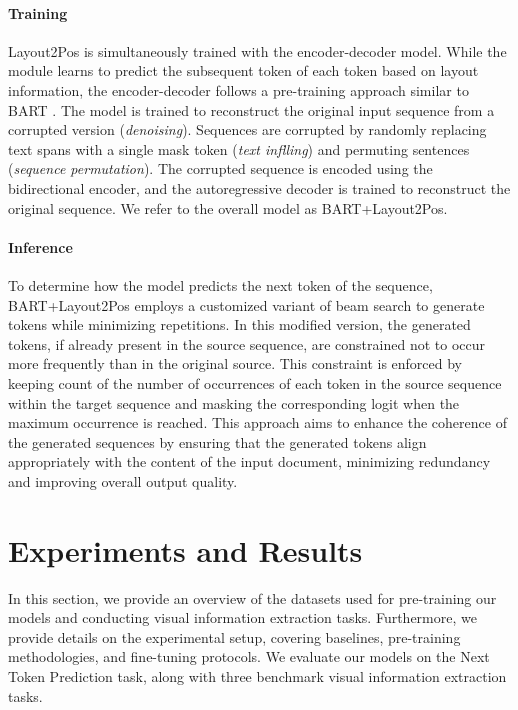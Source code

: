 \paragraph{Training} Layout2Pos is simultaneously trained with the encoder-decoder model. While the module learns to predict the subsequent token of each token based on layout information, the encoder-decoder follows a pre-training approach similar to \ac{BART}  \citep{lewis2006building}. The model is trained to reconstruct the original input sequence from a corrupted version (\textit{denoising}). Sequences are corrupted by randomly replacing text spans with a single mask token (\textit{text inflling}) and permuting sentences (\textit{sequence permutation}). The corrupted sequence is encoded using the bidirectional encoder, and the autoregressive decoder is trained to reconstruct the original sequence. We refer to the overall model as BART+Layout2Pos.

\paragraph{Inference} To determine how the model predicts the next token of the sequence, BART+Layout2Pos employs a customized variant of beam search to generate tokens while minimizing repetitions. In this modified version, the generated tokens, if already present in the source sequence, are constrained not to occur more frequently than in the original source. This constraint is enforced by keeping count of the number of occurrences of each token in the source sequence within the target sequence and masking the corresponding logit when the maximum occurrence is reached. This approach aims to enhance the coherence of the generated sequences by ensuring that the generated tokens align appropriately with the content of the input document, minimizing redundancy and improving overall output quality.


\section{Experiments and Results}

In this section, we provide an overview of the datasets used for pre-training our models and conducting visual information extraction tasks. Furthermore, we provide details on the experimental setup, covering baselines, pre-training methodologies, and fine-tuning protocols. We evaluate our models on the Next Token Prediction task, along with three benchmark visual information extraction tasks. 

